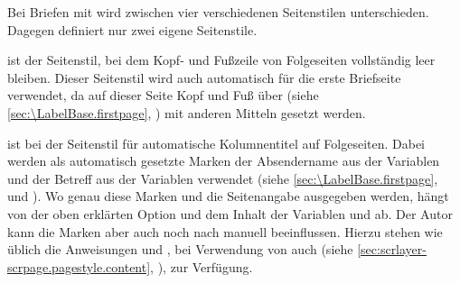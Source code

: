 \begin{Declaration}
\end{Declaration}%
%
%
%
%
Bei Briefen mit  wird zwischen vier
verschiedenen Seitenstilen unterschieden. Dagegen definiert
 nur zwei eigene Seitenstile.
\begin{description}
\item[{\PageStyle{empty}}]
  ist der Seitenstil, bei dem Kopf- und Fußzeile von
  Folgeseiten vollständig leer bleiben. Dieser Seitenstil wird auch
  automatisch für die erste Briefseite verwendet, da auf dieser Seite Kopf und
  Fuß über  (siehe
  \autoref{sec:\LabelBase.firstpage}, )
  mit anderen Mitteln gesetzt werden.
\item[{\PageStyle{headings}}]
  ist bei  der Seitenstil für
  automatische Kolumnentitel auf Folgeseiten. Dabei werden als automatisch
  gesetzte Marken der Absendername aus der Variablen
   und der
  Betreff aus der Variablen
   verwendet
  (siehe \autoref{sec:\LabelBase.firstpage},
   und
  ). Wo genau diese Marken und die
  Seitenangabe ausgegeben werden, hängt von der oben erklärten Option
   und dem Inhalt der Variablen
   und
   ab. Der Autor
  kann die Marken aber auch noch nach  manuell
  beeinflussen. Hierzu stehen wie üblich die Anweisungen
   und ,
  bei Verwendung von
  \hyperref[cha:scrlayer-scrpage]{}%
  auch  (siehe
  \autoref{sec:scrlayer-scrpage.pagestyle.content},
  ), zur Verfügung.


\end{description}
